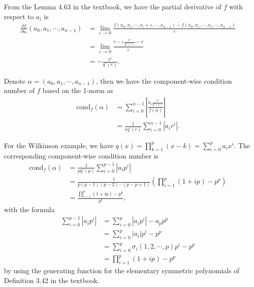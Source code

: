 \documentclass[a4paper]{article}
\begin{document}
From the Lemma 4.63 in the textbook, we have the partial derivative of $f$ with respect to $a_i$ is
\begin{equation}
    \begin{aligned}
        \frac{\partial f}{\partial a_i}(a_0, a_1, \cdots, a_{n - 1}) &= \lim_{\varepsilon \to 0}\frac{f(x_0, x_1, \cdots, x_i + \varepsilon, \cdots, x_{n - 1}) - f(x_0, x_1, \cdots, x_i, \cdots, x_{n - 1})}{\varepsilon} \\
        &= \lim_{\varepsilon \to 0}\frac{r - \varepsilon \frac{r^i}{q'(r)} - r}{\varepsilon} \\
        &= -\frac{r^i}{q'(r)}.
    \end{aligned}
    \label{eq:11_partial_derivative}
\end{equation}

Denote $\alpha = (a_0, a_1, \cdots, a_{n - 1})$, then we have the component-wise condition number of $f$ based on the 1-norm as
\begin{equation}
    \begin{aligned}
        \text{cond}_f (\alpha) &= \sum_{i = 0}^{n - 1} \left|\frac{a_i \frac{r^i}{q'(r)}}{f(\alpha)}\right| \\
        &= \frac{1}{rq'(r)} \sum_{i = 0}^{n - 1} \left|a_i r^i\right|.
    \end{aligned}
    \label{eq:11_cond_f_1norm}
\end{equation}

For the Wilkinson example, we have $q(x) = \prod_{k = 1}^p (x - k) = \sum_{i = 0}^p a_i x^i$. The corresponding component-wise condition number is 
\begin{equation}
    \begin{aligned}
        \text{cond}_f (\alpha) &= \frac{1}{pq'(p)} \sum_{i = 0}^{p - 1} \left|a_i p^i\right| \\
        &= \frac{1}{p(p - 1)(p - 2)\cdots(p - p + 1)} (\prod_{i = 1}^p(1 + ip) - p^p) \\
        &= \frac{\prod_{i = 1}^p(1 + ip) - p^p}{p!},
    \end{aligned}
    \label{eq:11_cond_f_wilkinson}
\end{equation}
with the formula
\begin{equation}
    \begin{aligned}
        \sum_{i = 0}^{p - 1} |a_i p^i| &= \sum_{i = 0}^p |a_i p^i| - a_p p^p \\
        &= \sum_{i = 0}^p |a_i| p^i - p^p \\
        &= \sum_{i = 0}^p \sigma_i(1, 2, \cdots, p) p^i - p^p \\
        &= \prod_{i = 1}^p (1 + ip) - p^p
    \end{aligned}
    \label{eq:11_sum_formula}
\end{equation}
by using the generating function for the elementary symmetric polynomials of Definition 3.42 in the textbook.
\end{document}
